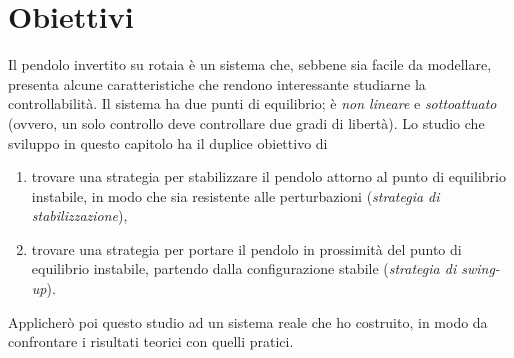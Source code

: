 \section{Obiettivi}
Il pendolo invertito su rotaia è un sistema che,
sebbene sia facile da modellare, presenta alcune
caratteristiche che rendono interessante studiarne la
controllabilità. Il sistema ha due punti di equilibrio; è
\emph{non lineare} e \emph{sottoattuato} (ovvero, un solo controllo
deve controllare due gradi di libertà).
Lo studio che sviluppo in questo capitolo ha il duplice obiettivo di
\begin{enumerate}
    \item trovare una strategia per stabilizzare il pendolo attorno al punto di equilibrio instabile, in modo che sia resistente alle perturbazioni (\emph{strategia di stabilizzazione}),
    \item trovare una strategia per portare il pendolo in prossimità del punto di equilibrio instabile, partendo dalla configurazione stabile (\emph{strategia di swing-up}).
\end{enumerate}
Applicherò poi questo studio ad un sistema reale che ho costruito, 
in modo da confrontare i risultati teorici con quelli pratici.